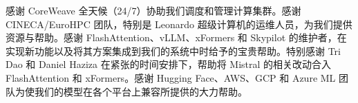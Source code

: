 \documentclass[a4paper,11pt]{article}
\providecommand{\bipar}[2]{#2}
\begin{document}
\bipar{We are grateful to CoreWeave for their 24/7 help in marshalling our cluster. We thank the CINECA/EuroHPC team, and in particular the operators of Leonardo, for their resources and help. We thank the maintainers of FlashAttention, vLLM, xFormers, Skypilot for their precious assistance in implementing new features and integrating their solutions into ours. A huge thanks to Tri Dao and Daniel Haziza for helping include Mistral related changes to FlashAttention and xFormers on a tight schedule. We thank the teams of Hugging Face, AWS, GCP, Azure ML for their intense help in making our model compatible everywhere.}{感谢 CoreWeave 全天候（24/7）协助我们调度和管理计算集群。感谢 CINECA/EuroHPC 团队，特别是 Leonardo 超级计算机的运维人员，为我们提供资源与帮助。感谢 FlashAttention、vLLM、xFormers 和 Skypilot 的维护者，在实现新功能以及将其方案集成到我们的系统中时给予的宝贵帮助。特别感谢 Tri Dao 和 Daniel Haziza 在紧张的时间安排下，帮助将 Mistral 的相关改动合入 FlashAttention 和 xFormers。感谢 Hugging Face、AWS、GCP 和 Azure ML 团队为使我们的模型在各个平台上兼容所提供的大力帮助。}
\end{document}
